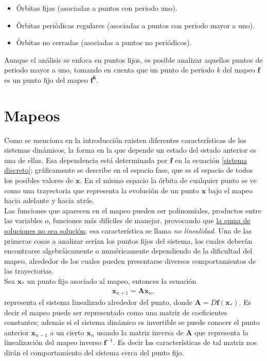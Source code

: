 \begin{itemize}
\item  Órbitas fijas (asociadas a puntos con periodo uno).
\item Órbitas periódicas regulares (asociadas a puntos con periodo mayor a uno).
\item Órbitas no cerradas (asociadas a puntos no periódicos).
\end{itemize}
Aunque el análisis se enfoca en puntos fijos, es posible analizar aquellos puntos de periodo mayor a uno, tomando en cuenta que un punto de periodo $k$ del mapeo $\mathbf{f}$ es un punto fijo del mapeo $\mathbf{f^{k}}.$
\section{Mapeos}
Como se menciona en la introducción existen diferentes características de los sis\-te\-mas dinámicos, la forma en la que depende un estado del estado anterior es una de ellas. Esa dependencia está determinada por $\mathbf{f}$ en la ecuación \eqref{sistema discreto}; gráficamente se describe en el espacio fase, que es el espacio de todos los posibles valores de $\pmb x$. En el mismo espacio la órbita de cualquier punto se ve como una trayectoria que representa la evolución de un punto $\pmb x$ bajo el mapeo hacia adelante y hacia atrás. \\

Las funciones que aparecen en el mapeo pueden ser polinomiales, productos entre las variables o, funciones más difíciles de manejar, provocando que \underline{la suma de soluciones no sea solución}; esa característica se llama \textit{no linealidad}. Una de las primeras cosas a analizar serían los puntos fijos del sistema, los cuales deberán encontrarse algebráicamente o numéricamente dependiendo de la dificultad del mapeo, alrededor de los cuales pueden presentarse diversos comportamientos de las trayectorias.\\

Sea $\mathbf{x}_{*}$ un punto fijo asociado al mapeo, entonces la ecuación
\begin{eqnarray}
\mathbf{x}_{n+1} =\mathbf{A}\mathbf{x}_{n},
\end{eqnarray}
representa el sistema linealizado alrededor del punto, donde $\mathbf{A}=D\mathbf{f}(\mathbf{x}_{*})$. Es decir el mapeo puede ser representado como una matriz de coeficientes constantes; además si el sistema dinámico es invertible se puede conocer el punto anterior $\mathbf{x}_{n-1}$ a un cierto $\mathbf{x}_{n}$ usando la matriz inversa de $\mathbf{A}$ que representa la linealización del mapeo inverso $\mathbf{f}^{-1}$. Es decir las características de tal matriz nos dirán el comportamiento del sistema cerca del punto fijo. \\


